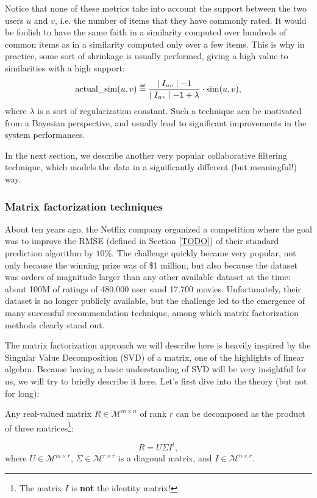 Notice that none of these metrics take into account the support between the two
users $u$ and $v$, i.e. the number of items that they have commonly rated. It
would be foolish to have the same faith in a similarity computed over hundreds
of common items as in a similarity computed only over a few items. This is why
in practice, some sort of shrinkage is usually performed, giving a high value
to similarities with a high support:
$$\text{actual\_sim}(u, v) \eqdef \frac{\mid \Iuv \mid - 1}{\mid \Iuv \mid - 1
+ \lambda} \cdot \ssim(u, v),$$
where $\lambda$ is a sort of regularization constant. Such  a technique acn be
motivated from a Bayesian perspective, and usually lead to significant
improvements in the system performances.

In the next section, we describe another very popular collaborative filtering
technique, which models the data in a significantly different (but meaningful!)
way.

\subsubsection{Matrix factorization techniques}

About ten years ago, the Netflix company organized a competition where the goal
was to improve the RMSE (defined in Section \ref{TODO}) of their standard
prediction algorithm by $10\%$. The challenge quickly became very popular, not
only because the winning prize was of \$1 million, but also because the dataset
was orders of magnitude larger than any other available dataset at the time: about
100M of ratings of 480.000 user sand 17.700 movies. Unfortunately, their
dataset is no longer publicly available, but the challenge led to the emergence
of many successful recommendation technique, among which matrix factorization
methods clearly stand out.

The matrix factorization approach we will describe here is heavily inspired by
the Singular Value Decomposition (SVD) of a matrix, one of the highlights of
linear algebra. Because having a basic understanding of SVD will be very
insightful for us, we will try to briefly describe it here. Let's first dive
into the theory (but not for long):

\begin{proposition}
  Any real-valued matrix $R \in \mathcal{M}^{m \times n}$ of rank $r$ can be
  decomposed as the product of three matrices\footnote{The matrix $I$ is
  \textbf{not} the identity matrix!}:

  $$R = U\Sigma I^t,$$
  where $U\in \mathcal{M}^{m \times r}$, $\Sigma\in \mathcal{M}^{r \times r}$
  is a diagonal matrix, and $I\in \mathcal{M}^{n \times r}$.
\end{proposition}

